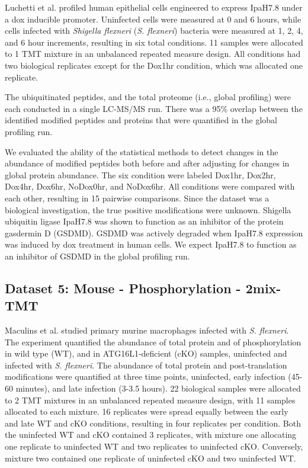 \documentclass[mcp]{article}
\numberwithin{table}{section}
\begin{document}
\medskip {}  Luchetti et al. \cite{LUCHETTI2021} profiled human epithelial cells engineered to express IpaH7.8 under a dox inducible promoter. Uninfected cells were measured at 0 and 6 hours, while cells infected with {\it Shigella flexneri} ({\it S. flexneri}) bacteria were measured at 1, 2, 4, and 6 hour increments, resulting in six total conditions. 11 samples were allocated to 1 TMT mixture in an unbalanced repeated measure design. All conditions had two biological replicates except for the Dox1hr condition, which was allocated one replicate.

\medskip {} The ubiquitinated peptides, and the total proteome (i.e., global profiling) were each conducted in a single LC-MS/MS run. There was a 95\% overlap between the identified modified peptides and proteins that were quantified in the global profiling run.

\medskip {} We evaluated the ability of the statistical methods to detect changes in the abundance of modified peptides both before and after adjusting for changes in global protein abundance. The six condition were labeled Dox1hr, Dox2hr, Dox4hr, Dox6hr, NoDox0hr, and NoDox6hr. All conditions were compared with each other, resulting in 15 pairwise comparisons. Since the dataset was a biological investigation, the true positive modifications were unknown. Shigella ubiquitin ligase IpaH7.8 was shown to function as an inhibitor of the protein gasdermin D (GSDMD). GSDMD was actively degraded when IpaH7.8 expression was induced by dox treatment in human cells. We expect IpaH7.8 to function as an inhibitor of GSDMD in the global profiling run.


\subsection*{Dataset 5: Mouse - Phosphorylation - 2mix-TMT}
\label{sec:exp_proc_dataset5}


\medskip {} Maculins et al. \cite{Maculins} studied primary murine macrophages infected with {\it S. flexneri}. The experiment quantified the abundance of total protein and of phosphorylation in wild type (WT), and in ATG16L1-deficient (cKO) samples, uninfected and infected with {\it S. flexneri}. The abundance of total protein and post-translation modifications were quantified at three time points, uninfected, early infection (45-60 minutes), and late infection (3-3.5 hours). 22 biological samples were allocated to 2 TMT mixtures in an unbalanced repeated measure design, with 11 samples allocated to each mixture. 16 replicates were spread equally between the early and late WT and cKO conditions, resulting in four replicates per condition. Both the uninfected WT and cKO contained 3 replicates, with mixture one allocating one replicate to uninfected WT and two replicates to uninfected cKO. Conversely, mixture two contained one replicate of uninfected cKO and two uninfected WT.
\end{document}
